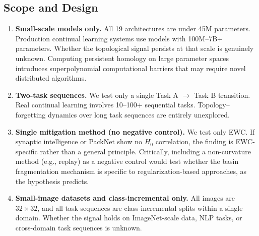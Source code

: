 \documentclass[10pt,twocolumn]{article}
\begin{document}
\subsection{Scope and Design}
\begin{enumerate}
    \item \textbf{Small-scale models only.} All 19 architectures are under 45M parameters. Production continual learning systems use models with 100M--7B+ parameters. Whether the topological signal persists at that scale is genuinely unknown. Computing persistent homology on large parameter spaces introduces superpolynomial computational barriers that may require novel distributed algorithms.
    \item \textbf{Two-task sequences.} We test only a single Task A $\rightarrow$ Task B transition. Real continual learning involves 10--100+ sequential tasks. Topology--forgetting dynamics over long task sequences are entirely unexplored.
    \item \textbf{Single mitigation method (no negative control).} We test only EWC. If synaptic intelligence \citep{zenke2017continual} or PackNet \citep{mallya2018packnet} show no $H_0$ correlation, the finding is EWC-specific rather than a general principle. Critically, including a non-curvature method (e.g., replay) as a negative control would test whether the basin fragmentation mechanism is specific to regularization-based approaches, as the hypothesis predicts.
    \item \textbf{Small-image datasets and class-incremental only.} All images are $32 \times 32$, and all task sequences are class-incremental splits within a single domain. Whether the signal holds on ImageNet-scale data, NLP tasks, or cross-domain task sequences is unknown.
\end{enumerate}
\end{document}
